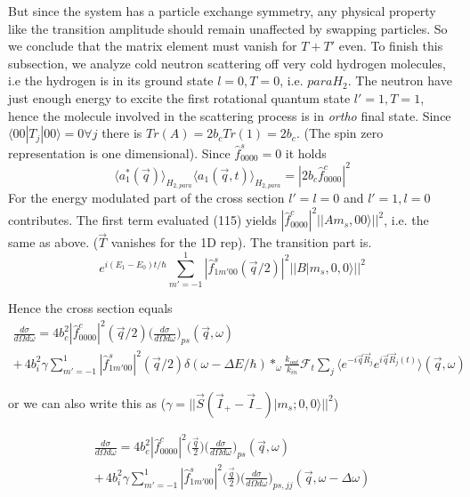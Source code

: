 \documentclass[11pt,a4paper]{article}
\begin{document}
But since the system has a particle exchange symmetry, any physical property like the transition amplitude should
remain unaffected by swapping particles. So we conclude that the matrix element must vanish for $T + T'$ even.
\newpage
To finish this subsection, we analyze cold neutron scattering off very cold hydrogen molecules, i.e the hydrogen
is in its ground state $l=0, T=0$, i.e. $para H_2$. The neutron have just enough energy to excite the first rotational
quantum state $l'=1, T=1$, hence the molecule involved in the scattering process is in \textit{ortho} final state.  Since
$\langle 00|T_j|00\rangle = 0 \forall j$ there is $Tr(A) = 2b_c Tr(1) = 2b_c$. (The spin zero representation is
one dimensional). Since $\hat f^s_{0000}=0$ it holds
\begin{equation}
\langle a_{1}^{*} (\vec q)  \rangle_{H_{2,para}} \langle a_{1} (\vec q, t) \rangle_{H_{2,para}}
=
|2b_c \hat f^c_{0000}|^2
\end{equation}
For the energy modulated part of the cross section $l'=l=0$ and $l'=1,l=0$ contributes. The first term evaluated (115)
yields $|\hat f^c_{0000}|^2 || A m_s,00\rangle ||^2$, i.e. the same as above. ($\vec T$ vanishes for the 1D rep).
The transition part is.
\begin{equation}
e^{i  (E_{1} - E_{0}) t /\hbar }
\sum_{m'=-1}^{1} |\hat f_{1m'00}^s (\vec q /2)|^2
||B |m_s, 0, 0 \rangle ||^ 2
\end{equation}

Hence the cross section equals
\begin{equation}
\begin{split}
\frac{d \sigma}{ d \Omega d \omega} =
4b_c^2 |\hat f^c_{0000}|^2(\vec q /2) \biggl( \frac{d \sigma}{ d \Omega d \omega} \biggr)_{ps}(\vec q, \omega)
\\ +\,
4 b_i^2  \gamma \sum_{m'=-1}^{1} |\hat f_{1m'00}^s |^2 (\vec q /2)
\delta(\omega - \Delta E /\hbar) *_{\omega}
\frac{k_{out}}{k_{in}} \mathcal{F}_t \sum_{j} \langle e^{-i \vec q \vec R_{j}} e^{i \vec q \vec R_j (t)} \rangle (\vec q, \omega)
\end{split}
\end{equation}

or we can also write this as ($\gamma = ||\vec S (\vec I_{+} - \vec I_{-}) |m_s; 0, 0 \rangle ||^ 2$)

\begin{equation}
\begin{split}
\frac{d \sigma}{ d \Omega d \omega} =
4b_c^2 |\hat f^c_{0000}|^2 \bigl(\frac{\vec q}{ 2}\bigr) \biggl( \frac{d \sigma}{ d \Omega d \omega} \biggr)_{ps}(\vec q, \omega)
\\ +\,
4 b_i^2 \gamma \sum_{m'=-1}^{1} |\hat f_{1m'00}^s |^2 \bigl(\frac{\vec q}{ 2}\bigr)
\biggl( \frac{d \sigma}{ d \Omega d \omega} \biggr)_{ps, jj}(\vec q, \omega - \Delta \omega)
\end{split}
\end{equation}
\end{document}
